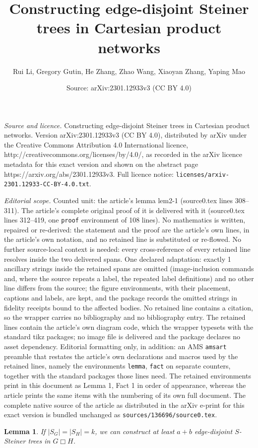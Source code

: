 \documentclass[10pt,a4paper]{amsart}
\title{Constructing edge-disjoint Steiner trees in Cartesian product networks}
\author{Rui Li, Gregory Gutin, He Zhang, Zhao Wang, Xiaoyan Zhang, Yaping Mao}
\date{Source: arXiv:2301.12933v3 (CC BY 4.0)}
\newtheorem{lemma}{Lemma}
\begin{document}
\maketitle

\noindent\emph{Source and licence.} Constructing edge-disjoint Steiner trees in Cartesian product networks. Version arXiv:2301.12933v3 (CC BY 4.0), distributed by arXiv under the Creative Commons Attribution 4.0 International licence, http://creativecommons.org/licenses/by/4.0/, as recorded in the arXiv licence metadata for this exact version and shown on the abstract page https://arxiv.org/abs/2301.12933v3. Full licence notice: \texttt{licenses/arxiv-2301.12933-CC-BY-4.0.txt}.\par\smallskip

\noindent\textit{Editorial scope.} Counted unit: the article's lemma lem2-1 (source0.tex lines 308--311). The article's complete original proof of it is delivered with it (source0.tex lines 312--419, one \texttt{proof} environment of 108 lines). No mathematics is written, repaired or re-derived: the statement and the proof are the article's own lines, in the article's own notation, and no retained line is substituted or re-flowed.  No further source-local context is needed: every cross-reference of every retained line resolves inside the two delivered spans.  One declared adaptation: exactly 1 ancillary strings inside the retained spans are omitted (image-inclusion commands and, where the source repeats a label, the repeated label definitions) and no other line differs from the source; the figure environments, with their placement, captions and labels, are kept, and the package records the omitted strings in fidelity receipts bound to the affected bodies.  No retained line contains a citation, so the wrapper carries no bibliography and no bibliography entry.  The retained lines contain the article's own diagram code, which the wrapper typesets with the standard tikz packages; no image file is delivered and the package declares no asset dependency.  Editorial formatting only, in addition: an AMS \texttt{amsart} preamble that restates the article's own declarations and macros used by the retained lines, namely the environments \texttt{lemma}, \texttt{fact} on separate counters, together with the standard packages those lines need.  The retained environments print in this document as Lemma 1, Fact 1 in order of appearance, whereas the article prints the same items with the numbering of its own full document.  The complete native source of the article as distributed in the arXiv e-print for this exact version is bundled unchanged as \texttt{sources/136696/source0.tex}.
\begin{lemma}\label{lem2-1}
If $|S_G|=|S_H|=k$, we can construct at least $a+b$
edge-disjoint $S$-Steiner trees in $G\Box H$.
\end{lemma}
\end{document}
